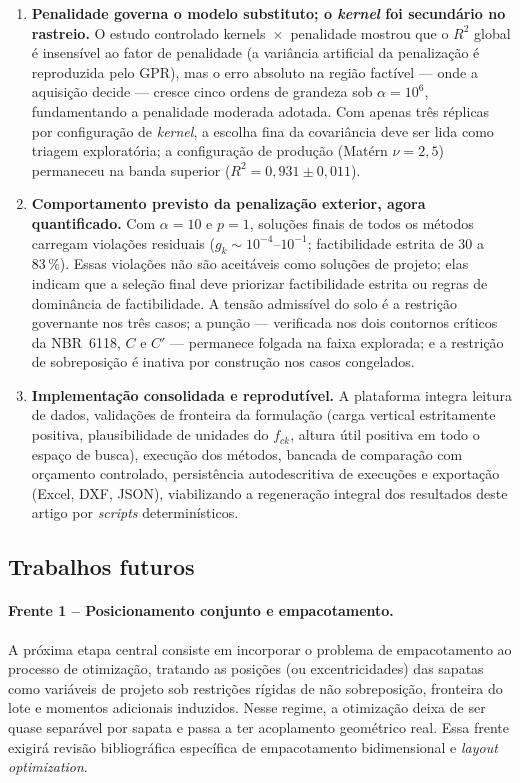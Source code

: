 \begin{enumerate}
    \item \textbf{Penalidade governa o modelo substituto; o \textit{kernel} foi secundário no rastreio.} O estudo controlado kernels~$\times$~penalidade mostrou que o $R^2$ global é insensível ao fator de penalidade (a variância artificial da penalização é reproduzida pelo GPR), mas o erro absoluto na região factível — onde a aquisição decide — cresce cinco ordens de grandeza sob $\alpha = 10^{6}$, fundamentando a penalidade moderada adotada. Com apenas três réplicas por configuração de \textit{kernel}, a escolha fina da covariância deve ser lida como triagem exploratória; a configuração de produção (Matérn $\nu = 2{,}5$) permaneceu na banda superior ($R^2 = 0{,}931 \pm 0{,}011$).
    \item \textbf{Comportamento previsto da penalização exterior, agora quantificado.} Com $\alpha = 10$ e $p = 1$, soluções finais de todos os métodos carregam violações residuais ($g_k \sim 10^{-4}$--$10^{-1}$; factibilidade estrita de $30$ a $83\,\%$). Essas violações não são aceitáveis como soluções de projeto; elas indicam que a seleção final deve priorizar factibilidade estrita ou regras de dominância de factibilidade. A tensão admissível do solo é a restrição governante nos três casos; a punção — verificada nos dois contornos críticos da NBR~6118, $C$ e $C'$ — permanece folgada na faixa explorada; e a restrição de sobreposição é inativa por construção nos casos congelados.
    \item \textbf{Implementação consolidada e reprodutível.} A plataforma \fundaai{} integra leitura de dados, validações de fronteira da formulação (carga vertical estritamente positiva, plausibilidade de unidades do $f_{ck}$, altura útil positiva em todo o espaço de busca), execução dos métodos, bancada de comparação com orçamento controlado, persistência autodescritiva de execuções e exportação (Excel, DXF, JSON), viabilizando a regeneração integral dos resultados deste artigo por \textit{scripts} determinísticos.
\end{enumerate}

\subsection{Trabalhos futuros}
\label{sec:trabalhos_futuros}

\paragraph{Frente 1 -- Posicionamento conjunto e empacotamento.}
A próxima etapa central consiste em incorporar o problema de empacotamento ao processo de otimização, tratando as posições (ou excentricidades) das sapatas como variáveis de projeto sob restrições rígidas de não sobreposição, fronteira do lote e momentos adicionais induzidos. Nesse regime, a otimização deixa de ser quase separável por sapata e passa a ter acoplamento geométrico real. Essa frente exigirá revisão bibliográfica específica de empacotamento bidimensional e \textit{layout optimization}.

